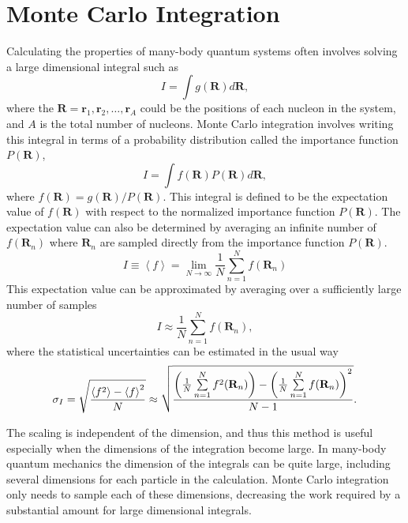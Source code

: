 \section{Monte Carlo Integration}
Calculating the properties of many-body quantum systems often involves solving a large dimensional integral such as
\begin{equation}
   I=\int g(\mathbf{R}) d\mathbf{R},
\end{equation}
where the $\mathbf{R}=\mathbf{r}_1,\mathbf{r}_2,\ldots,\mathbf{r}_A$ could be the positions of each nucleon in the system, and $A$ is the total number of nucleons. Monte Carlo integration involves writing this integral in terms of a probability distribution called the importance function $P(\mathbf{R})$,
\begin{equation}
   I=\int f(\mathbf{R}) P(\mathbf{R}) d\mathbf{R},
\end{equation}
where $f(\mathbf{R}) = g(\mathbf{R})/P(\mathbf{R})$. This integral is defined to be the expectation value of $f(\mathbf{R})$ with respect to the normalized importance function $P(\mathbf{R})$. The expectation value can also be determined by averaging an infinite number of $f(\mathbf{R}_n)$ where $\mathbf{R}_n$ are sampled directly from the importance function $P(\mathbf{R})$.
\begin{equation}
   I \equiv \left<f\right> = \lim\limits_{N\rightarrow\infty} \frac{1}{N} \sum\limits_{n=1}^N f(\mathbf{R}_n)
   \label{equ:mci}
\end{equation}
This expectation value can be approximated by averaging over a sufficiently large number of samples
\begin{equation}
   I \approx \frac{1}{N} \sum\limits_{n=1}^N f(\mathbf{R}_n),
\end{equation}
where the statistical uncertainties can be estimated in the usual way
\begin{equation}
   \sigma_{I} = \sqrt{\frac{\left< f^2 \right>-\left< f \right>^2}{N}} \approx \sqrt{\frac{\left(\frac{1}{N}\sum\limits_{n=1}^Nf^2(\mathbf{R}_n)\right) - \left(\frac{1}{N}\sum\limits_{n=1}^Nf(\mathbf{R}_n)\right)^2}{N-1}}.
\end{equation}

The scaling is independent of the dimension, and thus this method is useful especially when the dimensions of the integration become large. In many-body quantum mechanics the dimension of the integrals can be quite large, including several dimensions for each particle in the calculation. Monte Carlo integration only needs to sample each of these dimensions, decreasing the work required by a substantial amount for large dimensional integrals.

